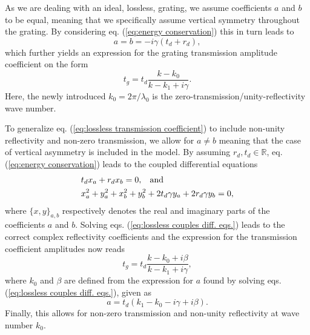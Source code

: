 As we are dealing with an ideal, lossless, grating, we assume coefficients $a$ and $b$ to be equal, meaning that we specifically assume vertical symmetry throughout the grating. By considering eq. (\ref{eq:energy conservation}) this in turn leads to 
\begin{equation}
    a = b = -i \gamma (t_d + r_d),
\end{equation}
which further yields an expression for the grating transmission amplitude coefficient on the form
\begin{equation}
    t_g = t_d \frac{k - k_0}{k - k_1 + i \gamma}.
    \label{eq:lossless transmission coefficient}
\end{equation}
Here, the newly introduced $k_0 = 2\pi/\lambda_0$ is the zero-transmission/unity-reflectivity wave number.

To generalize eq. (\ref{eq:lossless transmission coefficient}) to include non-unity reflectivity and non-zero transmission, we allow for $a \neq b$ meaning that the case of vertical asymmetry is included in the model. By assuming $r_d,t_d \in \mathbb{R}$, eq. (\ref{eq:energy conservation}) leads to the coupled differential equations
\begin{equation}
    \begin{split}
        &t_d x_a + r_d x_b = 0, \hspace{0.3cm} \text{and} \\
        &x_a^2 + y_a^2 + x_b^2 + y_b^2 + 2 t_d \gamma y_a + 2 r_d \gamma y_b = 0,
    \end{split}
    \label{eq:lossless couples diff. eqs.}
\end{equation}
where $\{x,y\}_{a,b}$ respectively denotes the real and imaginary parts of the coefficients $a$ and $b$. Solving eqs. (\ref{eq:lossless couples diff. eqs.}) leads to the correct complex reflectivity coefficients and the expression for the transmission coefficient amplitudes now reads
\begin{equation}
    t_g = t_d \frac{k - k_0 + i \beta}{k - k_1 + i \gamma},
    \label{eq:lossy transmission coefficients}
\end{equation}
where $k_0$ and $\beta$ are defined from the expression for $a$ found by solving eqs. (\ref{eq:lossless couples diff. eqs.}), given as
\begin{equation}
    a = t_d (k_1 - k_0 - i \gamma + i \beta).
\end{equation}
Finally, this allows for non-zero transmission and non-unity reflectivity at wave number $k_0$.

